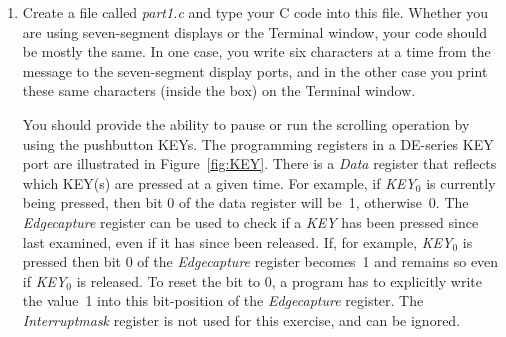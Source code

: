 \documentclass[epsfig,10pt,fullpage]{article}
\begin{document}
\begin{enumerate}
\item Create a file called {\it part1.c} and type your C code into this file. Whether you are 
using seven-segment displays or the Terminal window, your code should be mostly the same. In 
one case, you write six characters at a time from the message to the seven-segment display 
ports, and in the other case you print these same characters (inside the box) on the 
Terminal window. 

You should provide the ability to pause or run the scrolling operation by using the pushbutton 
KEYs. The programming registers in a DE-series KEY port are illustrated in Figure~\ref{fig:KEY}.
There is a {\it Data} register that reflects which KEY(s) are pressed at a given time. For 
example, if {\it KEY}$_0$ is currently being pressed, then bit 0 of the data register will be~1,
otherwise~0. The {\it Edgecapture} register can be used to check if a {\it KEY} has been 
pressed since last examined, even if it has since been released. If, for example, 
{\it KEY}$_0$ is pressed then bit 0 of the {\it Edgecapture} register becomes~1 and 
remains so even if {\it KEY}$_0$ is released. To reset the bit to 0, a program has to 
explicitly write the value~1 into this bit-position of the {\it Edgecapture} register. 
The {\it Interruptmask} register is not used for this exercise, and can be ignored.


\end{enumerate}
\end{document}
